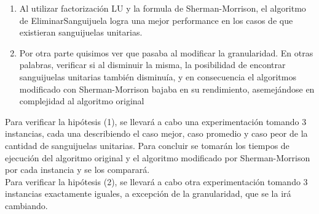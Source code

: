 \begin{enumerate}
\item Al utilizar factorización LU y la formula de Sherman-Morrison, el algoritmo de EliminarSanguijuela logra una mejor performance en los casos de que existieran sanguijuelas unitarias.
\item Por otra parte quisimos ver que pasaba al modificar la granularidad. En otras palabras, verificar si al disminuir la misma, la posibilidad de encontrar sanguijuelas unitarias también disminuía, y en consecuencia el algoritmos modificado con Sherman-Morrison bajaba en su rendimiento, asemejándose en complejidad al algoritmo original\\
\end{enumerate}


Para verificar la hipótesis (1), se llevará a cabo una experimentación tomando 3 instancias, cada una describiendo el caso mejor, caso promedio y caso peor de la cantidad de sanguijuelas unitarias. Para concluir se tomarán los tiempos de ejecución del algoritmo original y el algoritmo modificado por Sherman-Morrison por cada instancia y se los comparará.\\
Para verificar la hipótesis (2), se llevará a cabo otra experimentación tomando 3 instancias exactamente iguales, a excepción de la granularidad, que se la irá cambiando.
